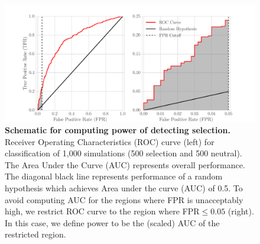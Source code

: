 \begin{figure}[H]
	\centering
	\includegraphics[trim=0.4in 0 .8in 0.02in , 
	clip,width=\textwidth]{figures/powerROC.pdf}
	\caption{{\bf Schematic for computing power of detecting
            selection.} Receiver Operating Characteristics (ROC) curve
            (left) for classification of 1,000 simulations (500 selection and
          500 neutral). The Area Under the Curve (AUC) represents
          overall performance. The diagonal black line represents
          performance of a random hypothesis which achieves Area under
          the curve (AUC) of 0.5. To avoid computing AUC for the
          regions where FPR is unacceptably high, we restrict ROC
          curve to the region where FPR$\le 0.05$ (right). In this
          case, we define power to be the (scaled) AUC of the
          restricted region.} \label{fig:powerROC}
\end{figure}






